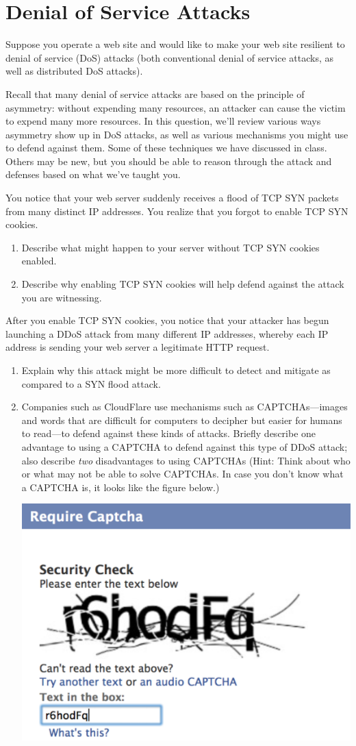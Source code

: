 \newpage
\section{Denial of Service Attacks}

Suppose you operate a web site and would like to make your web site resilient to denial
of service (DoS) attacks (both conventional denial of service attacks, as well as
distributed DoS attacks).

Recall that many denial of service attacks are based on the principle of
asymmetry: without expending many resources, an attacker can cause the victim
to expend many more resources. In this question, we'll review various ways
asymmetry show up in DoS attacks, as well as various mechanisms you might use
to defend against them. Some of these techniques we have discussed in class.
Others may be new, but you should be able to reason through the attack and
defenses based on what we've taught you.

You notice that your
web server suddenly receives a flood of TCP SYN packets from many distinct IP
addresses. You realize that you forgot to enable TCP SYN cookies. 

\begin{enumerate}
\item Describe
what might happen to your server without TCP SYN cookies enabled. 
\item Describe why enabling TCP SYN cookies will help defend against the attack
you are witnessing.
\end{enumerate}
\eprob

\newpage
{} After you enable TCP SYN cookies, you notice that your attacker has begun
launching a DDoS attack from many different IP addresses, whereby each IP address
is sending your web server a legitimate HTTP request. 
\begin{enumerate}
	\item Explain why this attack might be more difficult to detect and mitigate as
	compared to a SYN flood attack.
	\item Companies such as CloudFlare use mechanisms such as CAPTCHAs---images and
	words that are difficult for computers to decipher but easier for humans to read---to
	defend against these kinds of attacks. Briefly describe one advantage to using
	a CAPTCHA to defend against this type of DDoS attack; also describe {\em two} disadvantages
	to using CAPTCHAs (Hint: Think about who or what may not be able to solve CAPTCHAs.
	In case you don't know what a CAPTCHA is, it looks like the figure below.)

	\centering\includegraphics[width=0.3\linewidth]{captcha}
\end{enumerate}
\eprob
\fi

